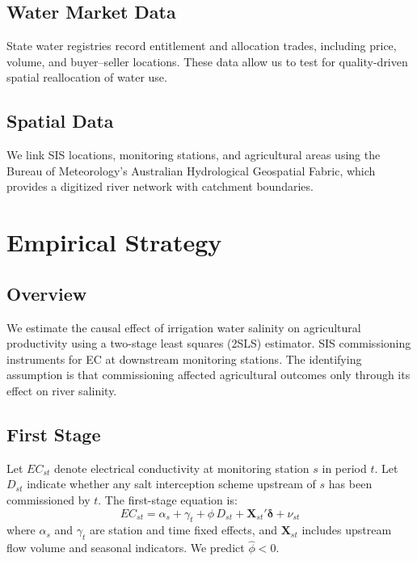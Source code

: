 \documentclass[12pt]{article}
\begin{document}
\subsection{Water Market Data}

State water registries record entitlement and allocation trades, including price, volume, and buyer--seller locations. These data allow us to test for quality-driven spatial reallocation of water use.

\subsection{Spatial Data}

We link SIS locations, monitoring stations, and agricultural areas using the Bureau of Meteorology's Australian Hydrological Geospatial Fabric, which provides a digitized river network with catchment boundaries.


\section{Empirical Strategy}\label{sec:design}

\subsection{Overview}

We estimate the causal effect of irrigation water salinity on agricultural productivity using a two-stage least squares (2SLS) estimator. SIS commissioning instruments for EC at downstream monitoring stations. The identifying assumption is that commissioning affected agricultural outcomes only through its effect on river salinity.

\subsection{First Stage}

Let $EC_{st}$ denote electrical conductivity at monitoring station $s$ in period $t$. Let $D_{st}$ indicate whether any salt interception scheme upstream of $s$ has been commissioned by $t$. The first-stage equation is:
\begin{equation}\label{eq:first_stage}
    EC_{st} = \alpha_s + \gamma_t + \phi \, D_{st} + \mathbf{X}_{st}'\boldsymbol{\delta} + \nu_{st}
\end{equation}
where $\alpha_s$ and $\gamma_t$ are station and time fixed effects, and $\mathbf{X}_{st}$ includes upstream flow volume and seasonal indicators. We predict $\hat{\phi} < 0$.
\end{document}
